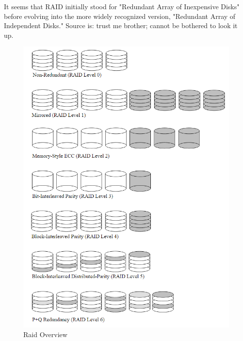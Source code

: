 \documentclass{article}
\begin{document}
It seems that RAID initially stood for "Redundant Array of Inexpensive Disks"
before evolving into the more widely recognized version, "Redundant Array of Independent Disks."
Source is: trust me brother; cannot be bothered to look it up.
\listoffigures
\listoftables


\begin{figure}[h]
    \label{fig:raid-overview}
    \includegraphics[width=\textwidth]{raid-overview}
    \caption{Raid Overview \cite{cmu:raidhighperf}}
\end{figure}
\end{document}
